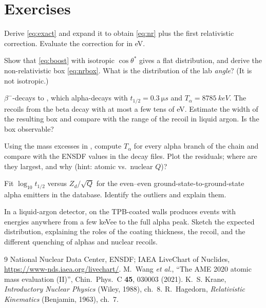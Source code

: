 \section{Exercises}
\begin{exercise}[A]
Derive \cref{eq:exact} and expand it to obtain \cref{eq:nr} plus the first relativistic correction. Evaluate the correction for  in eV.
\end{exercise}
\begin{exercise}[A]
Show that \cref{eq:boost} with isotropic $\cos\theta^*$ gives a flat distribution, and derive the non-relativistic box \cref{eq:nrbox}. What is the distribution of the lab \emph{angle}? (It is not isotropic.)
\end{exercise}
\begin{exercise}[A]
 $\beta^-$-decays to , which alpha-decays with $t_{1/2} = \SI{0.3}{\micro s}$ and $T_\alpha = \SI{8785}{keV}$. The  recoils from the beta decay with at most a few tens of eV. Estimate the width of the resulting box and compare with the range of the recoil in liquid argon. Is the box observable?
\end{exercise}
\begin{exercise}[P]
Using the mass excesses in , compute $T_\alpha$ for every alpha branch of the  chain and compare with the ENSDF values in the decay files. Plot the residuals; where are they largest, and why (hint: atomic vs.\ nuclear $Q$)?
\end{exercise}
\begin{exercise}[P]
Fit $\log_{10} t_{1/2}$ versus $Z_d/\sqrt{Q}$ for the even--even ground-state-to-ground-state alpha emitters in the database. Identify the outliers and explain them.
\end{exercise}
\begin{exercise}[R]
In a liquid-argon detector,  on the TPB-coated walls produces events with energies anywhere from a few keVee to the full alpha peak. Sketch the expected distribution, explaining the roles of the coating thickness, the recoil, and the different quenching of alphas and nuclear recoils.
\end{exercise}

\begin{thebibliography}{9}
 National Nuclear Data Center, ENSDF; IAEA LiveChart of Nuclides, \url{https://www-nds.iaea.org/livechart/}.
 M.~Wang \emph{et al.}, ``The AME 2020 atomic mass evaluation (II)'', Chin.\ Phys.\ C \textbf{45}, 030003 (2021).
 K.~S. Krane, \emph{Introductory Nuclear Physics} (Wiley, 1988), ch.~8.
 R.~Hagedorn, \emph{Relativistic Kinematics} (Benjamin, 1963), ch.~7.
\end{thebibliography}

